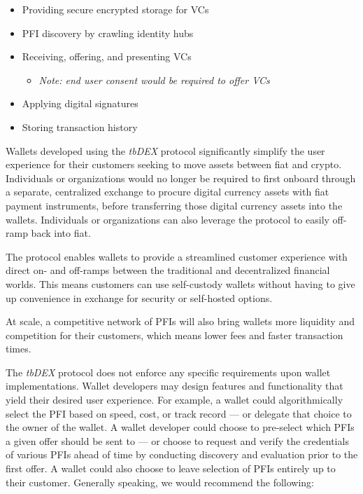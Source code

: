 \documentclass[11pt]{article}
\begin{document}
\begin{itemize}
	\item Providing secure encrypted storage for VCs

	\item PFI discovery by crawling identity hubs

	\item Receiving, offering, and presenting VCs

\begin{itemize}
	\item \textit{Note: end user consent would be required to offer VCs}

\end{itemize}
	\item Applying digital signatures

	\item Storing transaction history

\vspace{1\baselineskip}
\end{itemize}
Wallets developed using the \textit{tbDEX} protocol significantly simplify the user experience for their customers seeking to move assets between fiat and crypto. Individuals or organizations would no longer be required to first onboard through a separate, centralized exchange to procure digital currency assets with fiat payment instruments, before transferring those digital currency assets into the wallets. Individuals or organizations can also leverage the protocol to easily off-ramp back into fiat. 

\vspace{1\baselineskip}
The protocol enables wallets to provide a streamlined customer experience with direct on- and off-ramps between the traditional and decentralized financial worlds. This means customers can use self-custody wallets without having to give up convenience in exchange for security or self-hosted options. 

\vspace{1\baselineskip}
At scale, a competitive network of PFIs will also bring wallets more liquidity and competition for their customers, which means lower fees and faster transaction times.

\vspace{1\baselineskip}
The \textit{tbDEX }protocol does not enforce any specific requirements upon wallet implementations. Wallet developers may design features and functionality that yield their desired user experience. For example, a wallet could algorithmically select the PFI based on speed, cost, or track record — or delegate that choice to the owner of the wallet. A wallet developer could choose to pre-select which PFIs a given offer should be sent to — or choose to request and verify the credentials of various PFIs ahead of time by conducting discovery and evaluation prior to the first offer. A wallet could also choose to leave selection of PFIs entirely up to their customer. Generally speaking, we would recommend the following:
\end{document}

